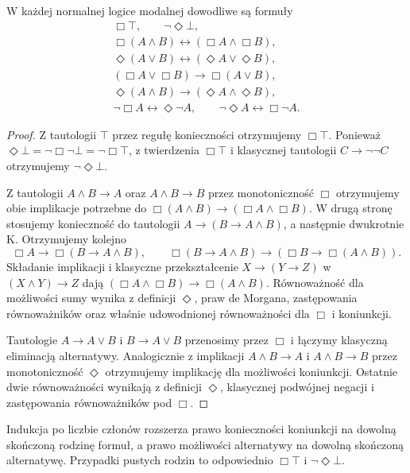 \begin{twierdzenie}
\label{thm:ncl-modal-normal-laws}
W każdej normalnej logice modalnej dowodliwe są
formuły
\[
\begin{gathered}
 \Box\top,\qquad \neg\Diamond\bot,\\
 \Box(A\wedge B)\leftrightarrow(\Box A\wedge\Box B),\\
 \Diamond(A\vee B)\leftrightarrow
                  (\Diamond A\vee\Diamond B),\\
 (\Box A\vee\Box B)\to\Box(A\vee B),\\
 \Diamond(A\wedge B)\to(\Diamond A\wedge\Diamond B),\\
 \neg\Box A\leftrightarrow\Diamond\neg A,\qquad
 \neg\Diamond A\leftrightarrow\Box\neg A.
\end{gathered}
\]
\end{twierdzenie}
\begin{proof}
Z tautologii $\top$ przez regułę konieczności
otrzymujemy $\Box\top$.
Ponieważ $\Diamond\bot=\neg\Box\neg\bot
=\neg\Box\top$, z twierdzenia $\Box\top$
i klasycznej tautologii $C\to\neg\neg C$
otrzymujemy $\neg\Diamond\bot$.

Z tautologii $A\wedge B\to A$ oraz
$A\wedge B\to B$ przez monotoniczność $\Box$
otrzymujemy obie implikacje potrzebne do
$\Box(A\wedge B)\to(\Box A\wedge\Box B)$.
W drugą stronę stosujemy konieczność do tautologii
$A\to(B\to A\wedge B)$, a następnie dwukrotnie K.
Otrzymujemy kolejno
\[
 \Box A\to\Box(B\to A\wedge B),\qquad
 \Box(B\to A\wedge B)\to
       (\Box B\to\Box(A\wedge B)).
\]
Składanie implikacji i klasyczne przekształcenie
$X\to(Y\to Z)$ w $(X\wedge Y)\to Z$ dają
$(\Box A\wedge\Box B)\to\Box(A\wedge B)$.
Równoważność dla możliwości sumy wynika z definicji
$\Diamond$, praw de Morgana, zastępowania
równoważników oraz właśnie udowodnionej
równoważności dla $\Box$ i koniunkcji.

Tautologie $A\to A\vee B$ i $B\to A\vee B$
przenosimy przez $\Box$ i łączymy klasyczną
eliminacją alternatywy. Analogicznie z implikacji
$A\wedge B\to A$ i $A\wedge B\to B$ przez
monotoniczność $\Diamond$ otrzymujemy implikację
dla możliwości koniunkcji.
Ostatnie dwie równoważności wynikają z definicji
$\Diamond$, klasycznej podwójnej negacji i
zastępowania równoważników pod $\Box$.
\end{proof}
Indukcja po liczbie członów rozszerza prawo
konieczności koniunkcji na dowolną skończoną
rodzinę formuł, a prawo możliwości alternatywy
na dowolną skończoną alternatywę.
Przypadki pustych rodzin to odpowiednio
$\Box\top$ i $\neg\Diamond\bot$.


